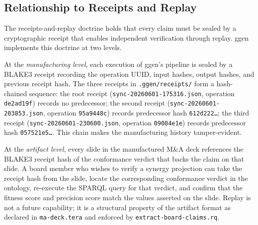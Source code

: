 \subsection{Relationship to Receipts and Replay}
\label{sec:ggen-lineage-receipts-replay}

The receipts-and-replay doctrine holds that every claim must be sealed by a cryptographic receipt
that enables independent verification through replay. ggen implements this doctrine at two levels.

At the \emph{manufacturing level}, each execution of ggen's pipeline is sealed by a BLAKE3 receipt
recording the operation UUID, input hashes, output hashes, and previous receipt hash. The three
receipts in \texttt{.ggen/receipts/} form a hash-chained sequence: the root receipt
(\texttt{sync-20260601-175316.json}, operation \texttt{de2ad19f}) records no predecessor;
the second receipt (\texttt{sync-20260601-203853.json}, operation \texttt{95a9448c}) records
predecessor hash \texttt{612d222\ldots}; the third receipt (\texttt{sync-20260601-230600.json},
operation \texttt{09084e1e}) records predecessor hash \texttt{057521e5\ldots}. This chain makes
the manufacturing history tamper-evident.

At the \emph{artifact level}, every slide in the manufactured M\&A deck references the BLAKE3
receipt hash of the conformance verdict that backs the claim on that slide. A board member who
wishes to verify a synergy projection can take the receipt hash from the slide, locate the
corresponding conformance verdict in the ontology, re-execute the SPARQL query for that verdict,
and confirm that the fitness score and precision score match the values asserted on the slide.
Replay is not a future capability; it is a structural property of the artifact format as declared
in \texttt{ma-deck.tera} and enforced by \texttt{extract-board-claims.rq}.
